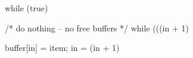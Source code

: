 \documentclass[varwidth=22em,crop]{standalone}
\begin{document}
\begin{ccode}
while (true) {
  /* do nothing -- no free buffers */
  while (((in + 1) %
  
  buffer[in] = item;
  in = (in + 1) %
}
\end{ccode}
\end{document}
